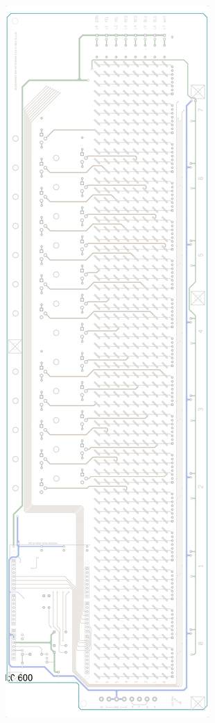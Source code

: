 \noindent\includegraphics[height=\textheight]{../hardware/matrix64x8_rgb_330_assembly-1.png}
\newpage
